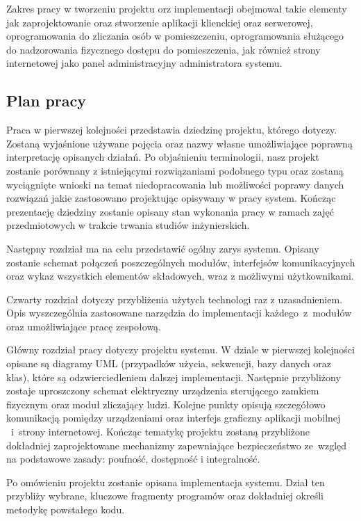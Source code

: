 Zakres pracy w tworzeniu projektu orz implementacji obejmował takie elementy jak zaprojektowanie oraz stworzenie aplikacji klienckiej oraz serwerowej, oprogramowania do zliczania osób w pomieszczeniu, oprogramowania służącego do nadzorowania fizycznego dostępu do pomieszczenia, jak również strony internetowej jako panel administracyjny administratora systemu.

\newpage
\subsection{Plan pracy}
Praca w pierwszej kolejności przedstawia dziedzinę projektu, którego dotyczy. Zostaną wyjaśnione używane pojęcia oraz nazwy własne umożliwiające poprawną interpretację opisanych działań. Po objaśnieniu terminologii, nasz projekt zostanie porównany z istniejącymi rozwiązaniami podobnego typu oraz zostaną wyciągnięte wnioski na temat niedopracowania lub możliwości poprawy danych rozwiązań jakie zastosowano projektując opisywany w pracy system. Kończąc prezentację dziedziny zostanie opisany stan wykonania pracy w ramach zajęć przedmiotowych w trakcie trwania studiów inżynierskich.

Następny rozdział ma na celu przedstawić ogólny zarys systemu. Opisany zostanie schemat połączeń poszczególnych modułów, interfejsów komunikacyjnych oraz wykaz wszystkich elementów składowych, wraz z możliwymi użytkownikami.

Czwarty rozdział dotyczy przybliżenia użytych technologi raz z uzasadnieniem. Opis wyszczególnia zastosowane narzędzia do implementacji każdego~z~modułów oraz umożliwiające pracę zespołową.

Główny rozdział pracy dotyczy projektu systemu. W dziale w pierwszej kolejności opisane są diagramy UML (przypadków użycia, sekwencji, bazy danych oraz klas), które są odzwierciedleniem dalszej implementacji. Następnie przybliżony zostaje uproszczony schemat elektryczny urządzenia sterującego zamkiem fizycznym oraz moduł zliczający ludzi. Kolejne punkty opisują szczegółowo komunikacją pomiędzy urządzeniami oraz interfejs graficzny aplikacji mobilnej ~i~strony internetowej. Kończąc tematykę projektu zostaną przybliżone dokładniej zaprojektowane mechanizmy zapewniające bezpieczeństwo ze~względ na podstawowe zasady: poufność, dostępność i integralność.

Po omówieniu projektu zostanie opisana implementacja systemu. Dział ten przybliży wybrane, kluczowe fragmenty programów oraz dokładniej określi metodykę powstałego kodu. 

